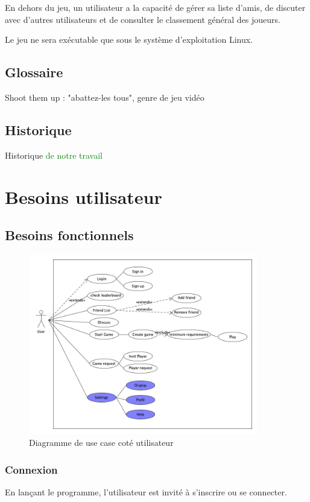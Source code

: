 \documentclass[a4paper,12pt]{article}
\renewcommand*{\emph}[1]{\textcolor{green}{#1}}
\begin{document}
En dehors du jeu, un utilisateur a la capacité de gérer sa liste d'amis, de discuter avec d'autres utilisateurs et de consulter le classement général des joueurs.

Le jeu ne sera exécutable que sous le système d'exploitation Linux.

\subsection{Glossaire}
Shoot them up : "abattez-les tous", genre de jeu vidéo

\subsection{Historique}
Historique \emph{de notre travail}

\section{Besoins utilisateur}

\subsection{Besoins fonctionnels}


\begin{figure}[h!]
\centering
\includegraphics[width=10cm]{UserUseCase1}
\caption{Diagramme de use case coté utilisateur}
\label{fig:UerUseCase}
\end{figure}

\subsubsection{Connexion}
En lançant le programme, l'utilisateur est invité à s'inscrire ou se connecter.
\end{document}
